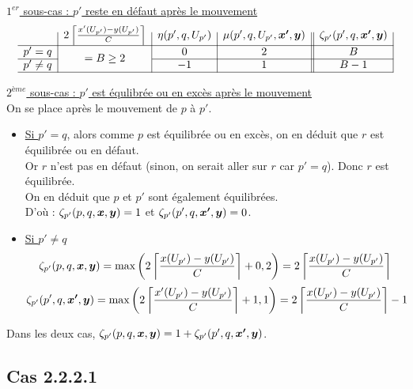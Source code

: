 \documentclass[twoside,11pt,openany,a4paper]{rapport}
\begin{document}
\underline{$1^{er}$ sous-cas : $p'$ reste en défaut après le mouvement}
\begin{gather*}
  \begin{array}{r|c|c|c||c|}
    & 2 \left\lceil \frac{x'(U_{p'})-y(U_{p'})}{C} \right\rceil
    & \eta(p',q,U_{p'})
    & \mu(p',q,U_{p'},\bs{x'},\bs{y})
    & \zeta_{p'}(p',q,\bs{x'},\bs{y})
    \\ \hline
    p' = q
    & \multirow{2}{*}{$= B \ge 2$}
    & 0
    & 2
    & B
    \\ \cline{1-1}\cline{3-5}
    p' \ne q
    &
    & -1
    & 1
    & B - 1
    \\ \hline
  \end{array}
\end{gather*}

\underline{$2^{ème}$ sous-cas : $p'$ est équlibrée ou en excès après le mouvement}\\
On se place après le mouvement de $p$ à $p'$.
\begin{itemize}
\item \underline{Si $p'=q$}, alors comme $p$ est équilibrée ou en excès, on en déduit que $r$ est équilibrée ou en défaut.\\
Or $r$ n'est pas en défaut (sinon, on serait aller sur $r$ car $p'=q$). Donc $r$ est équilibrée.\\
On en déduit que $p$ et $p'$ sont également équilibrées.\\
D'où : $\zeta_{p'}(p,q,\boldsymbol{x},\boldsymbol{y}) = 1$ et $\zeta_{p'}(p',q,\boldsymbol{x'},\boldsymbol{y}) = 0$.

\item \underline{Si $p' \ne q$}
\begin{equation}\notag
\zeta_{p'}(p,q,\boldsymbol{x},\boldsymbol{y})
= \mbox{max} \left( 2 \left\lceil \frac{x(U_{p'})-y(U_{p'})}{C} \right\rceil + 0, 2\right)
= 2 \left\lceil \frac{ x(U_{p'})-y(U_{p'})}{C} \right\rceil
\end{equation}
\begin{equation}\notag
\zeta_{p'}(p',q,\boldsymbol{x'},\boldsymbol{y})
= \mbox{max} \left( 2 \left\lceil \frac{x'(U_{p'})-y(U_{p'})}{C} \right\rceil + 1, 1\right)
= 2 \left\lceil \frac{x(U_{p'})-y(U_{p'})}{C} \right\rceil - 1
\end{equation}
\end{itemize}
Dans les deux cas, $\zeta_{p'}(p,q,\boldsymbol{x},\boldsymbol{y}) = 1 + \zeta_{p'}(p',q,\boldsymbol{x'},\boldsymbol{y})$.

\subsection*{Cas 2.2.2.1}
\end{document}
